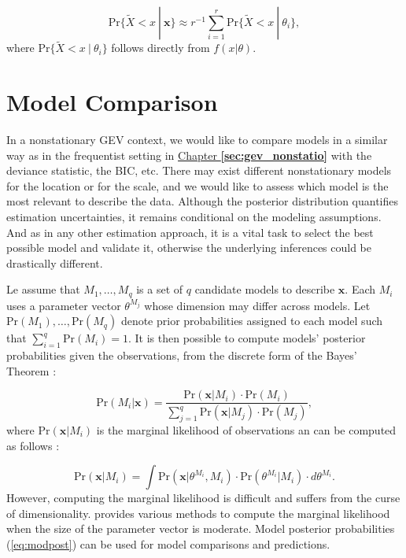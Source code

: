 \begin{equation}
\text{Pr}\{\tilde{X}<x\ | \ \boldsymbol{x}\}\approx r^{-1}\sum_{i=1}^r\text{Pr}\{\tilde{X}<x \ | \ \theta_i\},
\end{equation}
where $\text{Pr}\{\tilde{X}<x \ | \ \theta_i\}$ follows directly from $f(x|\theta)$. 



\section{Model Comparison}\label{sec:modcompbay}


In a nonstationary GEV context, we would like to compare models in a similar way as in the frequentist setting in \hyperref[sec:gev_nonstatio]{Chapter \textbf{\ref{sec:gev_nonstatio}}} with the deviance statistic, the BIC, etc.
There may exist different nonstationary models for the location or for the scale, and we would like to assess which model is the most relevant to describe the data.
Although the posterior distribution quantifies estimation uncertainties, it remains conditional on the modeling assumptions. And as in any other estimation approach, it is a vital task to select the best possible model and validate it, otherwise the underlying inferences could be drastically different. 

Le assume that $M_1,\ldots,M_q$ is a set of $q$ candidate models to describe $\boldsymbol{x}$. Each $M_i$ uses a parameter vector $\theta^{M_j}$ whose dimension may differ across models. Let $\text{Pr}(M_1),\ldots,\text{Pr}(M_q)$ denote prior probabilities assigned to each model such that $\sum_{i=1}^q \text{Pr}(M_i)=1$.
It is then possible to compute models' posterior probabilities given the observations, from the discrete form of the Bayes' Theorem : 

\begin{equation}\label{eq:modpost}
\text{Pr}(M_i|\boldsymbol{x})=\frac{\text{Pr}(\boldsymbol{x}|M_i)\cdot \text{Pr}(M_i)}{\sum_{j=1}^q \text{Pr}(\boldsymbol{x}|M_j)\cdot \text{Pr}(M_j)},
\end{equation}
where $\text{Pr}(\boldsymbol{x}|M_i)$ is the marginal likelihood of observations an can be computed as follows : 

\begin{equation*}
\text{Pr}(\boldsymbol{x}|M_i)=\int \text{Pr}(\boldsymbol{x}|\theta^{M_i},M_i)\cdot \text{Pr}(\theta^{M_i}|M_i)\cdot d\theta^{M_i}.
\end{equation*}
However, computing the marginal likelihood is difficult and suffers from the curse of dimensionality. \citet{Bos2002} provides various methods to compute the marginal likelihood when the size of the parameter vector is moderate.
Model posterior probabilities (\ref{eq:modpost}) can be used for model comparisons and predictions.

